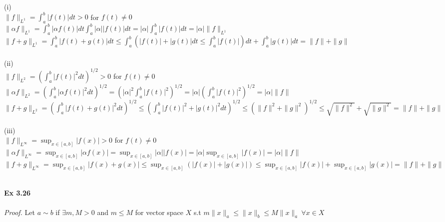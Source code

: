 \documentclass[letterpaper,12pt]{article}
\theoremstyle{definition}
\begin{document}
\begin{spacing}{1.3}{}
	\setlength{\leftskip}{20pt}
	(i) \\
	
	$\|f\|_{L^{1}} = \int_{a}^{b} |f(t)|dt >0$ for $f(t) \neq 0$ \\
	
	$\|\alpha f\|_{L^{1}} = \int_{a}^{b} |\alpha f(t)|dt \int_{a}^{b} |\alpha| |f(t)|dt = |\alpha| \int_{a}^{b} |f(t)|dt = |\alpha| \|f\|_{L^{1}}$ \\
	
	$\|f+g\|_{L^{1}} = \int_{a}^{b} |f(t)+g(t)|dt \leq \int_{a}^{b} (|f(t)|+|g(t)|dt \leq \int_{a}^{b}|f(t)|)dt + \int_{a}^{b}|      g(t)|dt                             = \|f\| + \|g\| $ \\\\
	
	(ii) \\
	
	$\|f\|_{L^{2}} = (\int_{a}^{b} |f(t)|^{2}dt)^{1/2} >0$ for $f(t) \neq 0$ \\
	
	$\|\alpha f\|_{L^{2}} = (\int_{a}^{b} |\alpha f(t)|^{2}dt)^{1/2} = ( |\alpha|^2 \int_{a}^{b} |f(t)|^{2})^{1/2} = |\alpha|(\int_{a}^{b} |f(t)|^{2})^{1/2} = |\alpha| \|f\| $\\
	
	$\|f+g\|_{L^{2}} = (\int_{a}^{b} |f(t)+g(t)|^2 dt)^{1/2} \leq (\int_{a}^{b} |f(t)|^2+|g(t)|^2 dt)^{1/2} \leq
             (\|f\|^2 + \|g\|^2)^{1/2} \leq \sqrt{\|f\|^2} + \sqrt{\|g\|^2} = \|f\|+\|g\|  $ \\\\
	
	(iii) \\
	
	$\|f\|_{L^{\infty}} = \sup_{x \in [a,b]} |f(x)| >0$ for $f(t) \neq 0$ \\
	
	$\|\alpha f\|_{L^{\infty}} = \sup_{x \in [a,b]} |\alpha f(x)| = \sup_{x \in [a,b]} |\alpha| |f(x)| = |\alpha| \sup_{x \in [a,b]} |f(x)| = |\alpha| \|f\|$\\
	
	$\|f+g\|_{L^{\infty}} = \sup_{x \in [a,b]} |f(x)+g(x)| \leq \sup_{x \in [a,b]} (|f(x)|+|g(x)|) \leq \sup_{x \in [a,b]} |f(x)| + \sup_{x \in [a,b]} |g(x)| = \|f\| + \|g\| $ \\\\
	
	
	\setlength{\leftskip}{10pt}
	
	\textbf{Ex 3.26} \\\\
	\emph{Proof.} Let $a \sim b$ if $\exists m,M > 0$ and $m \leq M$ for vector space $X$ s.t $m \|x\|_{a} \leq \|x\|_{b} \leq M \|x\|_{a} \ \forall x \in X$ \\\\
	

\end{spacing}
\end{document}
